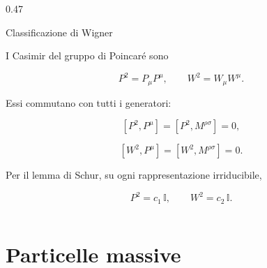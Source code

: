 \documentclass[11pt,t,aspectratio=169]{beamer}
\begin{document}
\begin{frame}[t]
\begin{columns}[T,onlytextwidth]
\begin{column}{0.47\textwidth}
            \begin{exampleblock}{Classificazione di Wigner}

                \begin{minipage}[t][0.78\textheight][t]{\linewidth}

                    I Casimir del gruppo di Poincaré sono

                    \[
                        P^2=P_\mu P^\mu,
                        \qquad
                        W^2=W_\mu W^\mu .
                    \]

                    Essi commutano con tutti i generatori:

                    \[
                        [P^2,P^\mu]
                        =
                        [P^2,M^{\rho\sigma}]
                        =
                        0,
                    \]

                    \[
                        [W^2,P^\mu]
                        =
                        [W^2,M^{\rho\sigma}]
                        =
                        0.
                    \]

                    Per il lemma di Schur, su ogni
                    rappresentazione irriducibile,

                    \[
                        P^2=c_1\,\mathbb I,
                        \qquad
                        W^2=c_2\,\mathbb I.
                    \]

                \end{minipage}

            \end{exampleblock}

        \end{column}

    \end{columns}

\end{frame}



\section{Particelle massive}
\end{document}
